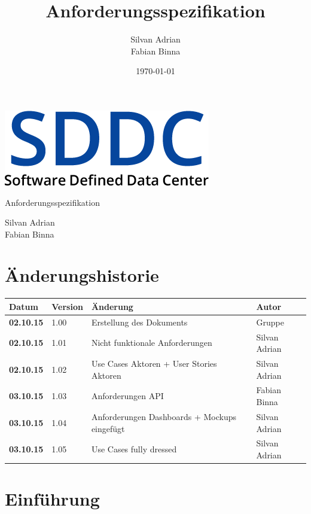 \documentclass[11pt]{scrartcl}
\title{Anforderungsspezifikation}
\author{Silvan Adrian \\ Fabian Binna}
\date{\today{}}
\begin{document}
\def\arraystretch{1.5}
\begin{titlepage}
\begin{center}
\vspace{10em}
\includegraphics[scale=2]{SDDC}
\vspace{10em}
\end{center}
\begin{center}
\huge {Anforderungsspezifikation}
\end{center}
\begin{center}
\vspace{10em}
\LARGE {Silvan Adrian} \\
\LARGE {Fabian Binna}
\end{center}

\end{titlepage}

\newpage
\section{Änderungshistorie}
\begin{tabularx}{\linewidth}{l l X l}
\textbf{Datum} & \textbf{Version} & \textbf{Änderung}  & \textbf{Autor} \\
\hline
\textbf{02.10.15} & 1.00 & Erstellung des Dokuments & Gruppe \\
\textbf{02.10.15} & 1.01 & Nicht funktionale Anforderungen & Silvan Adrian\\
\textbf{02.10.15} & 1.02 & Use Cases Aktoren + User Stories Aktoren & Silvan 
Adrian\\
\textbf{03.10.15} & 1.03 & Anforderungen API & Fabian Binna\\
\textbf{03.10.15} & 1.04 & Anforderungen Dashboards + Mockups eingefügt & Silvan 
Adrian\\
\textbf{03.10.15} & 1.05 & Use Cases fully dressed & Silvan Adrian\\

\end{tabularx}

\newpage
\tableofcontents
\newpage

\section{Einführung}
\end{document}
